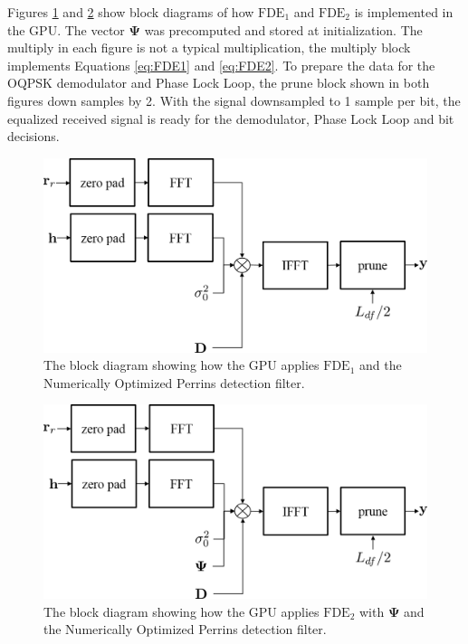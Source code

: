 Figures \ref{fig:apply_FDE1} and \ref{fig:apply_FDE2} show block diagrams of how $\text{FDE}_1$ and $\text{FDE}_2$ is implemented in the GPU.
The vector $\mathbf{\Psi}$ was precomputed and stored at initialization.
The multiply in each figure is not a typical multiplication, the multiply block implements Equations \eqref{eq:FDE1} and \eqref{eq:FDE2}.
To prepare the data for the OQPSK demodulator and Phase Lock Loop, the prune block shown in both figures down samples by 2.
With the signal downsampled to 1 sample per bit, the equalized received signal is ready for the demodulator, Phase Lock Loop and bit decisions.
\begin{figure}
	\centering\includegraphics[width=\textwidth/10*8]{figures/gpu/apply_FDE1.png}
	\caption{The block diagram showing how the GPU applies $\text{FDE}_1$ and the Numerically Optimized Perrins detection filter.}
	\label{fig:apply_FDE1}
\end{figure}
\begin{figure}
	\centering\includegraphics[width=\textwidth/10*8]{figures/gpu/apply_FDE2.png}
	\caption{The block diagram showing how the GPU applies $\text{FDE}_2$ with $\mathbf{\Psi}$ and the Numerically Optimized Perrins detection filter.}
	\label{fig:apply_FDE2}
\end{figure}

